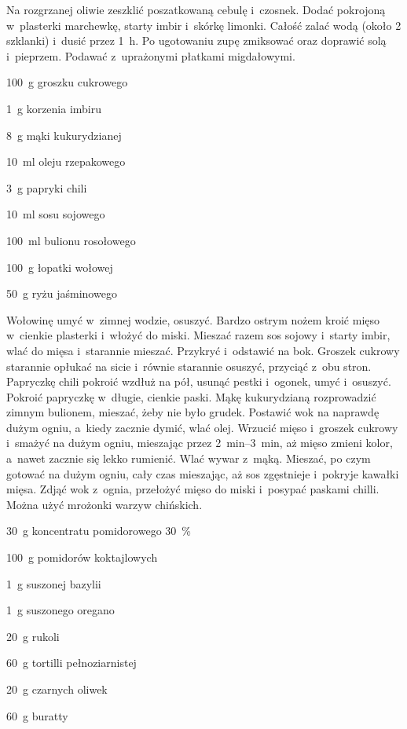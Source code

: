 \documentclass[../kucharek.tex]{subfiles}
\begin{document}
Na rozgrzanej oliwie zeszklić poszatkowaną cebulę i~czosnek. Dodać pokrojoną
w~plasterki marchewkę, starty imbir i~skórkę limonki. Całość zalać wodą (około
\num{2} szklanki) i~dusić przez \qty{1}{\hour}. Po ugotowaniu zupę zmiksować
oraz doprawić solą i~pieprzem. Podawać z~uprażonymi płatkami migdałowymi.


\begin{Ingred}
    \item \qty{100}{\gram} groszku cukrowego
    \item \qty{1}{\gram} korzenia imbiru
    \item \qty{8}{\gram} mąki kukurydzianej
    \item \qty{10}{\milli\litre} oleju rzepakowego
    \item \qty{3}{\gram}  papryki chili
    \item \qty{10}{\milli\litre} sosu sojowego
    \item \qty{100}{\milli\litre} bulionu rosołowego
    \item \qty{100}{\gram} łopatki wołowej
    \item \qty{50}{\gram} ryżu jaśminowego
\end{Ingred}

Wołowinę umyć w~zimnej wodzie, osuszyć. Bardzo ostrym nożem kroić mięso
w~cienkie plasterki i~włożyć do miski. Mieszać razem sos sojowy i~starty imbir,
wlać do mięsa i~starannie mieszać. Przykryć i~odstawić na bok. Groszek cukrowy
starannie opłukać na sicie i~równie starannie osuszyć, przyciąć z~obu stron.
Papryczkę chili pokroić wzdłuż na pół, usunąć pestki i~ogonek, umyć i~osuszyć.
Pokroić papryczkę w~długie, cienkie paski. Mąkę kukurydzianą rozprowadzić
zimnym bulionem, mieszać, żeby nie było grudek. Postawić wok na naprawdę dużym
ogniu, a~kiedy zacznie dymić, wlać olej. Wrzucić mięso i~groszek cukrowy
i~smażyć na dużym ogniu, mieszając przez \qtyrange{2}{3}{\minute}, aż mięso
zmieni kolor, a~nawet zacznie się lekko rumienić. Wlać wywar z~mąką. Mieszać,
po czym gotować na dużym ogniu, cały czas mieszając, aż sos zgęstnieje
i~pokryje kawałki mięsa. Zdjąć wok z~ognia, przełożyć mięso do miski i~posypać
paskami chilli. Można użyć mrożonki warzyw chińskich.


\begin{Ingred}
    \item \qty{30}{\gram} koncentratu pomidorowego \qty{30}{\percent}
    \item \qty{100}{\gram} pomidorów koktajlowych
    \item \qty{1}{\gram} suszonej bazylii
    \item \qty{1}{\gram} suszonego oregano
    \item \qty{20}{\gram} rukoli
    \item \qty{60}{\gram} tortilli pełnoziarnistej
    \item \qty{20}{\gram} czarnych oliwek
    \item \qty{60}{\gram} buratty
\end{Ingred}
\end{document}
